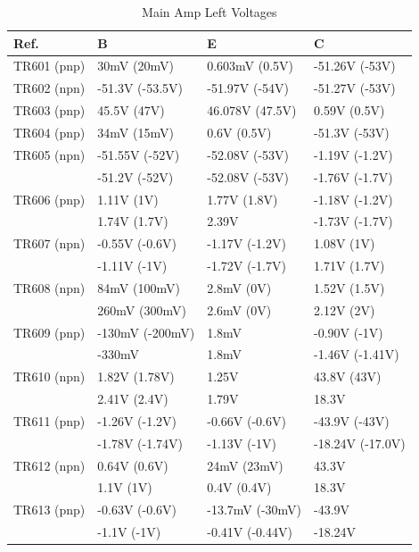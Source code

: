 \documentclass[]{article}
\begin{document}
\begin{table}[H]
	\centering
	\caption{Main Amp Left Voltages}
	\label{tab:main_amp_left_voltages}
	\begin{tabular}{|l|l|l|l|}
    \hline
 \textbf{Ref.} & \textbf{B} & \textbf{E} & \textbf{C} \\
    \hline
    TR601 (pnp) & 30mV (20mV) & 0.603mV (0.5V) & -51.26V (-53V)  \\
    \hline
    TR602 (npn) & -51.3V (-53.5V) & -51.97V (-54V) & -51.27V (-53V)  \\
    \hline
    TR603 (pnp) & 45.5V (47V) & 46.078V (47.5V) & 0.59V (0.5V) \\
    \hline
    TR604 (pnp) & 34mV (15mV) & 0.6V (0.5V) & -51.3V (-53V) \\
    \hline
    TR605 (npn) & -51.55V (-52V) & -52.08V (-53V) & -1.19V (-1.2V) \\
                & -51.2V (-52V)  & -52.08V (-53V) & -1.76V (-1.7V) \\
    \hline
    TR606 (pnp) & 1.11V (1V) & 1.77V (1.8V) & -1.18V (-1.2V) \\
                & 1.74V (1.7V) & 2.39V  & -1.73V (-1.7V) \\  
    \hline
    TR607 (npn) & -0.55V (-0.6V)  & -1.17V (-1.2V) & 1.08V (1V) \\
               & -1.11V (-1V)  & -1.72V (-1.7V) & 1.71V (1.7V) \\
    \hline
    TR608 (npn) & 84mV (100mV) & 2.8mV (0V)  & 1.52V (1.5V)   \\
                & 260mV (300mV)  & 2.6mV (0V) & 2.12V (2V)  \\
    \hline
    TR609 (pnp) & -130mV (-200mV) & 1.8mV  & -0.90V (-1V)  \\
                & -330mV  & 1.8mV  & -1.46V (-1.41V) \\
    \hline
    TR610 (npn) & 1.82V (1.78V) & 1.25V  & 43.8V (43V)  \\
                & 2.41V (2.4V) & 1.79V    & 18.3V   \\
    \hline
    TR611 (pnp) & -1.26V (-1.2V) & -0.66V (-0.6V) & -43.9V (-43V)  \\
                & -1.78V (-1.74V) & -1.13V (-1V) & -18.24V (-17.0V) \\
    \hline
    TR612 (npn) & 0.64V (0.6V) & 24mV (23mV) & 43.3V \\
                & 1.1V (1V) & 0.4V (0.4V) & 18.3V \\
    \hline
    TR613 (pnp) & -0.63V (-0.6V) & -13.7mV (-30mV)  & -43.9V   \\
                & -1.1V (-1V) & -0.41V (-0.44V)  & -18.24V  \\
    \hline
	\end{tabular}
\end{table}
\end{document}
